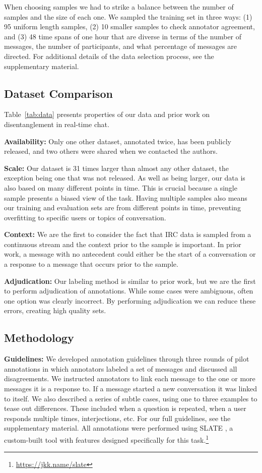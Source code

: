 \documentclass[11pt,a4paper]{article}
\newcommand{\tightparagraph}[1]{\noindent\textbf{#1:}}
\begin{document}
When choosing samples we had to strike a balance between the number of samples and the size of each one.
We sampled the training set in three ways:
(1) 95 uniform length samples,
(2) 10 smaller samples to check annotator agreement,
and (3) 48 time spans of one hour that are diverse in terms of the number of messages, the number of participants, and what percentage of messages are directed.
For additional details of the data selection process, see the supplementary material.

\subsection{Dataset Comparison}

Table~\ref{tab:data} presents properties of our data and prior work on disentanglement in real-time chat.

\tightparagraph{Availability}
Only one other dataset, annotated twice, has been publicly released, and two others were shared when we contacted the authors.

\tightparagraph{Scale}
Our dataset is 31 times larger than almost any other dataset, the exception being one that was not released.
As well as being larger, our data is also based on many different points in time.
This is crucial because a single sample presents a biased view of the task.
Having multiple samples also means our training and evaluation sets are from different points in time, preventing overfitting to specific users or topics of conversation.

\tightparagraph{Context}
We are the first to consider the fact that IRC data is sampled from a continuous stream and the context prior to the sample is important.
In prior work, a message with no antecedent could either be the start of a conversation or a response to a message that occurs prior to the sample.

\tightparagraph{Adjudication}
Our labeling method is similar to prior work, but we are the first to perform adjudication of annotations.
While some cases were ambiguous, often one option was clearly incorrect.
By performing adjudication we can reduce these errors, creating high quality sets.

\subsection{Methodology}

\tightparagraph{Guidelines}
We developed annotation guidelines through three rounds of pilot annotations in which annotators labeled a set of messages and discussed all disagreements.
We instructed annotators to link each message to the one or more messages it is a response to.
If a message started a new conversation it was linked to itself.
We also described a series of subtle cases, using one to three examples to tease out differences.
These included when a question is repeated, when a user responds multiple times, interjections, etc.
For our full guidelines, see the supplementary material.
All annotations were performed using SLATE \cite{acl19slate}, a custom-built tool with features designed specifically for this task.\footnote{\url{https://jkk.name/slate}}
\end{document}
